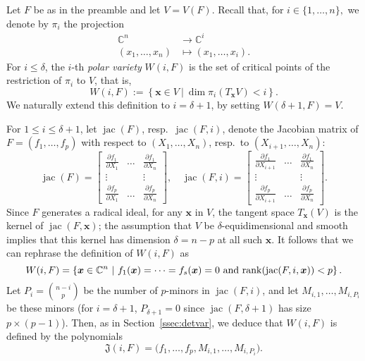 \documentclass[12pt]{article}
\def\frkJ{\mathfrak{J}}
\def\xb{{\bm x}}
\DeclareMathOperator{\jac}{jac}
\def\pa{\partial}
\def\C{\mathbb{C}}
\newtheorem{lemma}[theorem]{Lemma}
\begin{document}
Let $F$ be as in the preamble and let $V=V(F)$. Recall that, for $i
\in \{1,\hdots,n\},$ we denote by $\pi_i$ the projection
\begin{align*}
  \C^n &\rightarrow \C^i \\
  (x_1,\hdots,x_n) &\mapsto  (x_1,\hdots,x_i).    
\end{align*} 
For $i \le \delta$, the $i$-th \textit{polar variety} $W(i,F)$  is
the set of critical points of the restriction of $\pi_i$ to $V$, that
is,
\[W(i,F) := \left\{\xb \in V~|~\dim \pi_i(T_\xb V) < i\right\}.\]
We naturally extend this definition to $i=\delta+1$, by setting
$W({\delta+1},F)=V$.

For $1\le i \le \delta+1$, let $\jac(F)$, resp.\ $\jac(F, i)$, denote the
Jacobian matrix of $F=(f_1,\hdots,f_p)$ with respect to
$(X_{1},\hdots,X_n)$, resp.\ to $(X_{i+1},\hdots,X_n):$
\[
\jac(F)=
\left[ 
\begin{array}{ccc}
\frac{\pa f_1}{\pa X_{1}}&\hdots& \frac{\pa f_1}{\pa X_{n}} \\
\vdots& &\vdots\\
\frac{\pa f_p}{\pa X_{1}}&\hdots& \frac{\pa f_p}{\pa X_{n}} 
\end{array}
\right ],
\quad
\jac(F, i)=
\left[ 
\begin{array}{ccc}
\frac{\pa f_1}{\pa X_{i+1}}&\hdots& \frac{\pa f_1}{\pa X_{n}} \\
\vdots& &\vdots\\
\frac{\pa f_p}{\pa X_{i+1}}&\hdots& \frac{\pa f_p}{\pa X_{n}} 
\end{array}
\right]. 
\]
Since $F$ generates a radical ideal, for any $\xb$ in $V$, the tangent
space $T_\xb(V)$ is the kernel of $\jac(F,\xb)$; the assumption that
$V$ be $\delta$-equidimensional and smooth implies that this kernel
has dimension $\delta=n-p$ at all such $\xb$. It follows that 
we can rephrase the definition of $W(i,F)$ as
\[W(i,F) = \left\{\xb \in \C^n~|~ f_1(\xb)=\cdots=f_s(\xb)=0 
\text{~and~} {\rm rank}(\jac(F,i,\xb)) < p\right\}.\] Let $P_i
=\binom{n-i}{p}$ be the number of $p$-minors in $\jac(F,i)$, and let
$M_{i,1},\hdots,M_{i,P_i}$ be these minors (for $i=\delta+1$,
$P_{\delta+1}=0$ since $\jac(F,{\delta+1})$ has size $p \times
(p-1)$). Then, as in Section~\ref{ssec:detvar}, we deduce that
$W(i,F)$ is defined by the polynomials
\begin{equation}\label{eq:frkJ}
\frkJ(i,F) = \big(f_1,\hdots,f_p,M_{i,1},\hdots,M_{i,P_{i}}\big).  
\end{equation}
\end{document}
